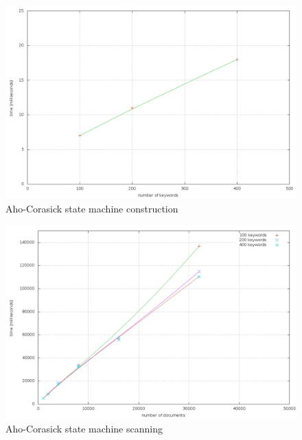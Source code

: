 \documentclass[10pt]{report}
\begin{document}
\begin{figure}
  \begin{center}
	\includegraphics[width=\textwidth,height=!]{ahostatemachine}
  \end{center}
  \caption{Aho-Corasick state machine construction}
  \label{fig:ahostatemachine}
\end{figure} 

\begin{figure}
  \begin{center}
	\includegraphics[width=\textwidth,height=!]{ahoscan}
  \end{center}
  \caption{Aho-Corasick state machine scanning}
  \label{fig:ahoscan}
\end{figure} 
\end{document}
